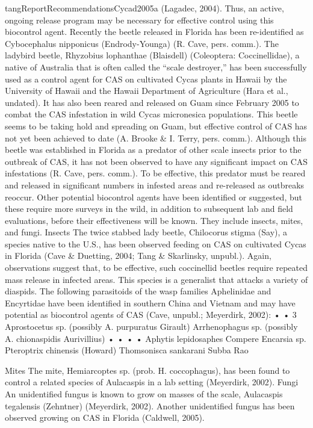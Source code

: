 \begin{appendices}
\begin{displaycquote}{tangReportRecommendationsCycad2005a}
(Lagadec, 2004). Thus, an active, ongoing release program may be necessary for effective control using this
biocontrol agent. Recently the beetle released in Florida has been re-identified as Cybocephalus nipponicus
(Endrody-Younga) (R. Cave, pers. comm.).
The ladybird beetle, Rhyzobius lophanthae (Blaisdell) (Coleoptera: Coccinellidae), a native of Australia
that is often called the “scale destroyer,” has been successfully used as a control agent for CAS on
cultivated Cycas plants in Hawaii by the University of Hawaii and the Hawaii Department of Agriculture
(Hara et al., undated). It has also been reared and released on Guam since February 2005 to combat the
CAS infestation in wild Cycas micronesica populations. This beetle seems to be taking hold and
spreading on Guam, but effective control of CAS has not yet been achieved to date (A. Brooke \& I. Terry,
pers. comm.). Although this beetle was established in Florida as a predator of other scale insects prior to
the outbreak of CAS, it has not been observed to have any significant impact on CAS infestations (R.
Cave, pers. comm.). To be effective, this predator must be reared and released in significant numbers in
infested areas and re-released as outbreaks reoccur.
Other potential biocontrol agents have been identified or suggested, but these require more surveys in the
wild, in addition to subsequent lab and field evaluations, before their effectiveness will be known. They
include insects, mites, and fungi.
Insects
The twice stabbed lady beetle, Chilocorus stigma (Say), a species native to the U.S., has been observed
feeding on CAS on cultivated Cycas in Florida (Cave \& Duetting, 2004; Tang \& Skarlinsky, unpubl.).
Again, observations suggest that, to be effective, such coccinellid beetles require repeated mass release in
infected areas. This species is a generalist that attacks a variety of diaspids.
The following parasitoids of the wasp families Aphelinidae and Encyrtidae have been identified in
southern China and Vietnam and may have potential as biocontrol agents of CAS (Cave, unpubl.;
Meyerdirk, 2002):
•
•
3
Aprostocetus sp. (possibly A. purpuratus
Girault)
Arrhenophagus sp. (possibly A. chionaspidis
Aurivillius)
•
•
•
•
Aphytis lepidosaphes Compere
Encarsia sp.
Pteroptrix chinensis (Howard)
Thomsonisca sankarani Subba Rao

Mites
The mite, Hemiarcoptes sp. (prob. H. coccophagus), has been found to control a related species of
Aulacaspis in a lab setting (Meyerdirk, 2002).
Fungi
An unidentified fungus is known to grow on masses of the scale, Aulacaspis tegalensis (Zehntner)
(Meyerdirk, 2002). Another unidentified fungus has been observed growing on CAS in Florida (Caldwell,
2005).
\end{displaycquote}


\end{appendices}
